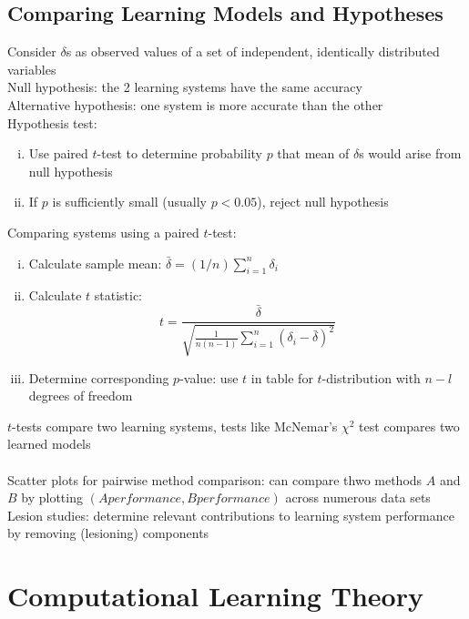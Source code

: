 \documentclass{article}
\begin{document}
		\subsection{Comparing Learning Models and Hypotheses}
			Consider $\delta$s as observed values of a set of independent, identically distributed variables \\
			Null hypothesis: the 2 learning systems have the same accuracy \\
			Alternative hypothesis: one system is more accurate than the other \\
			Hypothesis test:
			\begin{enumerate}[(i)]
				\item Use paired $t$-test to determine probability $p$ that mean of $\delta$s would arise from null hypothesis
				\item If $p$ is sufficiently small (usually $p < 0.05$), reject null hypothesis
				\end{enumerate}
			Comparing systems using a paired $t$-test: 
			\begin{enumerate}[(i)]
				\item Calculate sample mean: $\bar{\delta} = (1/n)\sum_{i = 1}^n \delta_i$
				\item Calculate $t$ statistic:
				\begin{equation*}
					t = \frac{\bar{\delta}}{\sqrt{\frac{1}{n(n - 1)}\sum\limits_{i = 1}^n (\delta_i - \bar{\delta})^2}}
					\end{equation*}
				\item Determine corresponding $p$-value: use $t$ in table for $t$-distribution with $n - l$ degrees of freedom
				\end{enumerate}
			$t$-tests compare two learning systems, tests like McNemar's $\chi^2$ test compares two learned models \\
			\\
			Scatter plots for pairwise method comparison: can compare thwo methods $A$ and $B$ by plotting $(A performance, B performance)$ across numerous data sets \\
			Lesion studies: determine relevant contributions to learning system performance by removing (lesioning) components
		\clearpage

	\section{Computational Learning Theory}
\end{document}
